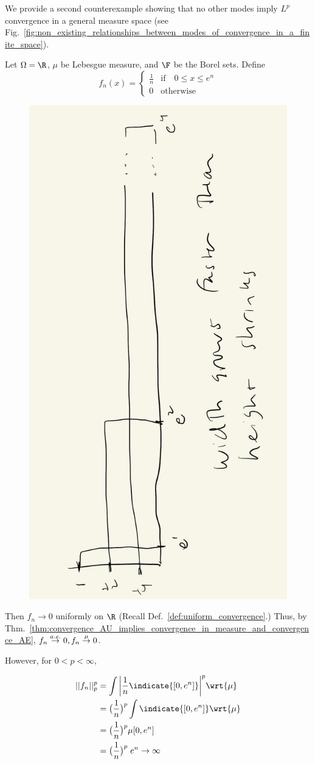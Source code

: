 \documentclass{article} %
\begin{document}
We provide a second counterexample showing that no other modes imply $L^p$ convergence in a general measure space (see Fig.~\ref{fig:non_existing_relationships_between_modes_of_convergence_in_a_finite_space}). 

Let $\Omega=\R$, $\mu$ be Lebesgue measure, and $\F$ be the Borel sets.  Define
\[f_n(x) =
\begin{cases}
\frac{1}{n} & \text{if} \quad 0 \leq x \leq e^n \\
0 & \text{otherwise}	
\end{cases}
 \]
 
\begin{figure}[H]
\centering
\includegraphics[width=.4\textwidth, angle=270]{images/modes_of_convergence_counter_example_2}	
\caption{}
\label{fig:modes_of_convergence_counter_example_2}	
\end{figure}

 Then $f_n \to 0$ uniformly on $\R$ {\tiny (Recall Def.~\ref{def:uniform_convergence}.)}  Thus, by Thm.~\ref{thm:convergence_AU_implies_convergence_in_measure_and_convergence_AE}, $f_n \stackrel{a.e.}{\to} 0, f_n \stackrel{\mu}{\to} 0$.
 
 However, for $0<p<\infty$,
 
 \begin{align*}
 ||f_n||_p^p &= \int \bigg| \frac{1}{n} \indicate{[0,e^n]} \bigg|^p \wrt{\mu} \\
 &= \big(\frac{1}{n}\big)^p \int \indicate{[0,e^n]}  \wrt{\mu} \\
 &= \big(\frac{1}{n}\big)^p \mu[0,e^n] \\
 &= \big(\frac{1}{n}\big)^p \; e^n \to \infty 
 \end{align*}
\end{document}
